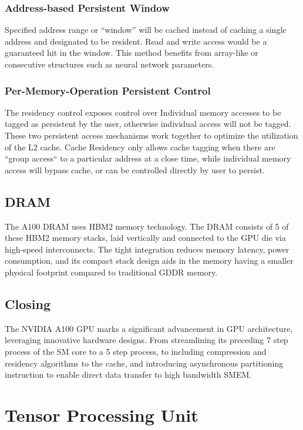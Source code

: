 \documentclass[conference]{IEEEtran}
\begin{document}
    \subsubsection{Address-based Persistent Window} Specified address range or “window” will be cached instead of caching a single address and designated to be resident.
    Read and write access would be a guaranteed hit in the window.
    This method benefits from array-like or consecutive structures such as neural network parameters.

    \subsubsection{Per-Memory-Operation Persistent Control} The residency control exposes control over Individual memory accesses to be tagged as persistent by the user, otherwise individual access will not be tagged.
    These two persistent access mechanisms work together to optimize the utilization of the L2 cache.
    Cache Residency only allows cache tagging when there are ``group access`` to a particular address at a close time, while individual memory access will bypass cache, or can be controlled directly by user to persist.

    \subsection{DRAM}
    The A100 DRAM uses HBM2 memory technology.
    The DRAM consists of 5 of these HBM2 memory stacks, laid vertically and connected to the GPU die via high-speed interconnects.
    The tight integration reduces memory latency, power consumption, and its compact stack design aids in the memory having a smaller physical footprint compared to traditional GDDR memory.

    \subsection{Closing}
    The NVIDIA A100 GPU marks a significant advancement in GPU architecture, leveraging innovative hardware designs.
    From streamlining its preceding 7 step process of the SM core to a 5 step process, to including compression and residency algorithms to the cache, and introducing asynchronous partitioning instruction to enable direct data transfer to high bandwidth SMEM\@.


    \section{Tensor Processing Unit}
\end{document}
